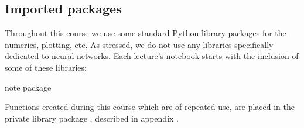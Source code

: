 \documentclass[a4paper,12pt,polish]{jupyterBook}
\begin{document}
\subsection{Imported packages}
\label{\detokenize{docs/intro:imported-packages}}
\sphinxAtStartPar
Throughout this course we use some standard Python library packages for the numerics, plotting, etc. As stressed, we do not use any libraries specifically dedicated to neural networks. Each lecture’s notebook starts with the inclusion of some of these libraries:
\begin{sphinxVerbatimInput}

\begin{sphinxVerbatim}[commandchars=\\\{\}]
                 
            
    
           
         

      
      
\end{sphinxVerbatim}
\end{sphinxVerbatimInput}

\begin{sphinxadmonition}{note}{ package}

\sphinxAtStartPar
Functions created during this course which are of repeated use, are placed in the private library package , described in appendix {\hyperref[\detokenize{docs/appendix:app-lab}]{}}.
\end{sphinxadmonition}
\end{document}
